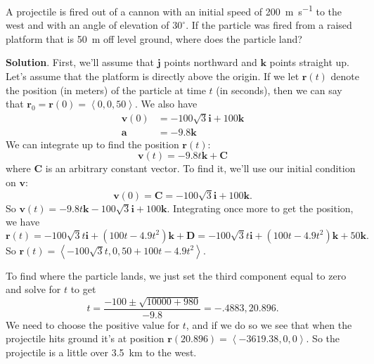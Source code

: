 \documentclass[10pt,]{book}
\theoremstyle{ptxplainnotitle}
\theoremstyle{ptxplaintitle}
\theoremstyle{ptxplainnotitle}
\theoremstyle{ptxplaintitle}
\theoremstyle{ptxplainnotitle}
\theoremstyle{ptxplaintitle}
\theoremstyle{ptxdefinitionnotitle}
\theoremstyle{ptxdefinitiontitle}
\theoremstyle{ptxdefinitionnotitle}
\theoremstyle{ptxdefinitiontitle}
\theoremstyle{ptxdefinitionnotitle}
\theoremstyle{ptxdefinitiontitle}
\theoremstyle{ptxdefinitionnotitle}
\theoremstyle{ptxdefinitiontitle}
\theoremstyle{ptxdefinitionnotitle}
\theoremstyle{ptxdefinitiontitle}
\numberwithin{equation}{section}
\newcommand{\vv}[1]{\mathbf{#1}}
\newcommand{\dotprod}[1]{\left\langle #1 \right\rangle}
\begin{document}
\begin{example}\label{example-motion-of-a-projectile}
\hypertarget{p-966}{}%
A projectile is fired out of a cannon with an initial speed of \SI{200}{\meter\per\second} to the west and with an angle of elevation of \(30^{\circ}\). If the particle was fired from a raised platform that is \SI{50}{\meter} off level ground, where does the particle land?%
\par\smallskip%
\noindent\textbf{Solution}.\hypertarget{solution-147}{}\quad%
\hypertarget{p-967}{}%
First, we'll assume that \(\vv{j}\) points northward and \(\vv{k}\) points straight up. Let's assume that the platform is directly above the origin. If we let \(\vv{r}(t)\) denote the position (in meters) of the particle at time \(t\) (in seconds), then we can say that \(\vv{r}_{0} = \vv{r}(0) = \dotprod{0,0,50}\). We also have%
%
\begin{align*}
\vv{v}(0) & = -100\sqrt{3}\vv{i} + 100\vv{k} \\
\vv{a} & = -9.8\vv{k} 
\end{align*}
\hypertarget{p-968}{}%
We can integrate up to find the position \(\vv{r}(t)\):%
%
\begin{equation*}
\vv{v}(t) = -9.8t\vv{k}+\vv{C}
\end{equation*}
\hypertarget{p-969}{}%
where \(\vv{C}\) is an arbitrary constant vector. To find it, we'll use our initial condition on \(\vv{v}\):%
%
\begin{equation*}
\vv{v}(0) = \vv{C} = -100\sqrt{3}\vv{i}+100\vv{k}.
\end{equation*}
\hypertarget{p-970}{}%
So \(\vv{v}(t) = -9.8t\vv{k}-100\sqrt{3}\vv{i}+100\vv{k}\). Integrating once more to get the position, we have%
%
\begin{equation*}
\vv{r}(t) = -100\sqrt{3}t\vv{i}+(100t-4.9t^{2})\vv{k} + \vv{D} = -100\sqrt{3}t\vv{i} + (100t-4.9t^{2})\vv{k} + 50\vv{k}\text{.}
\end{equation*}
\hypertarget{p-971}{}%
So \(\vv{r}(t) = \dotprod{-100\sqrt{3}t, 0, 50 + 100t - 4.9t^{2}}\).%
\par
\hypertarget{p-972}{}%
To find where the particle lands, we just set the third component equal to zero and solve for \(t\) to get%
%
\begin{equation*}
t = \frac{-100\pm\sqrt{10000+980}}{-9.8} = -.4883,20.896.
\end{equation*}
\hypertarget{p-973}{}%
We need to choose the positive value for \(t\), and if we do so we see that when the projectile hits ground it's at position \(\vv{r}(20.896) = \dotprod{-3619.38,0,0}.\) So the projectile is a little over \SI{3.5}{\kilo\meter} to the west.%
\end{example}
\end{document}
